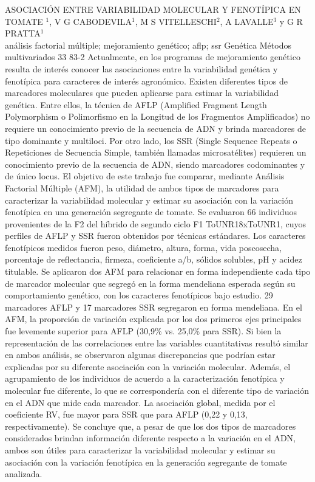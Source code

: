 \A
{ASOCIACIÓN ENTRE VARIABILIDAD MOLECULAR Y FENOTÍPICA EN TOMATE}
{$^1$, V G CABODEVILA$^1$, M S VITELLESCHI$^2$, A LAVALLE$^3$ y G R PRATTA$^1$}
{
\\}
{análisis factorial múltiple; mejoramiento genético; aflp; ssr} 
 {Genética} 
 {Métodos multivariados} 
 {33} 
 {83-2}
{Actualmente, en los programas de mejoramiento genético resulta de interés conocer las asociaciones entre la variabilidad genética y fenotípica para caracteres de interés agronómico. Existen diferentes tipos de marcadores moleculares que pueden aplicarse para estimar la variabilidad genética. Entre ellos, la técnica de AFLP (Amplified Fragment Length Polymorphism o Polimorfismo en la Longitud de los Fragmentos Amplificados) no requiere un conocimiento previo de la secuencia de ADN y brinda marcadores de tipo dominante y multiloci. Por otro lado, los SSR (Single Sequence Repeats o Repeticiones de Secuencia Simple, también llamadas microsatélites) requieren un conocimiento previo de la secuencia de ADN, siendo marcadores codominantes y de único locus. El objetivo de este trabajo fue comparar, mediante Análisis Factorial Múltiple (AFM), la utilidad de ambos tipos de marcadores para caracterizar la variabilidad molecular y estimar su asociación con la variación fenotípica en una generación segregante de tomate. Se evaluaron 66 individuos provenientes de la F2 del híbrido de segundo ciclo F1 ToUNR18xToUNR1, cuyos perfiles de AFLP y SSR fueron obtenidos por técnicas estándares. Los caracteres fenotípicos medidos fueron peso, diámetro, altura, forma, vida poscosecha, porcentaje de reflectancia, firmeza, coeficiente a/b, sólidos solubles, pH y acidez titulable. Se aplicaron dos AFM para relacionar en forma independiente cada tipo de marcador molecular que segregó en la forma mendeliana esperada según su comportamiento genético, con los caracteres fenotípicos bajo estudio. 29 marcadores AFLP y 17 marcadores SSR segregaron en forma mendeliana. En el AFM, la proporción de variación explicada por los dos primeros ejes principales fue levemente superior para AFLP (30,9\% vs. 25,0\% para SSR). Si bien la representación de las correlaciones entre las variables cuantitativas resultó similar en ambos análisis, se observaron algunas discrepancias que podrían estar explicadas por su diferente asociación con la variación molecular. Además, el agrupamiento de los individuos de acuerdo a la caracterización fenotípica y molecular fue diferente, lo que se correspondería con el diferente tipo de variación en el ADN que mide cada marcador. La asociación global, medida por el coeficiente RV, fue mayor para SSR que para AFLP (0,22 y 0,13, respectivamente). Se concluye que, a pesar de que los dos tipos de marcadores considerados brindan información diferente respecto a la variación en el ADN, ambos son útiles para caracterizar la variabilidad molecular y estimar su asociación con la variación fenotípica en la generación segregante de tomate analizada.}

